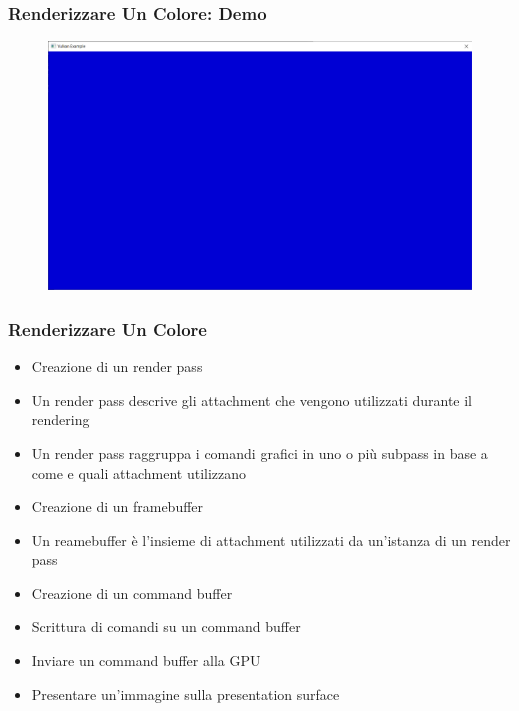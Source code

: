 \begin{frame}
\frametitle{Renderizzare Un Colore: Demo}
\begin{figure}[ht]
    \centering
    \includegraphics[scale=0.25]{images/SlidesClearWindow/ClearWindow.png}
\end{figure}
\end{frame}

\begin{frame}
\frametitle{Renderizzare Un Colore}

\begin{itemize}
\item Creazione di un render pass
\item Un render pass descrive gli attachment che vengono utilizzati durante il rendering
\item Un render pass raggruppa i comandi grafici in uno o più subpass in base a come e quali attachment utilizzano
\item Creazione di un framebuffer
\item Un reamebuffer è l'insieme di attachment utilizzati da un'istanza di un render pass
\item Creazione di un command buffer
\item Scrittura di comandi su un command buffer
\item Inviare un command buffer alla GPU
\item Presentare un'immagine sulla presentation surface
\end{itemize}
\end{frame}
